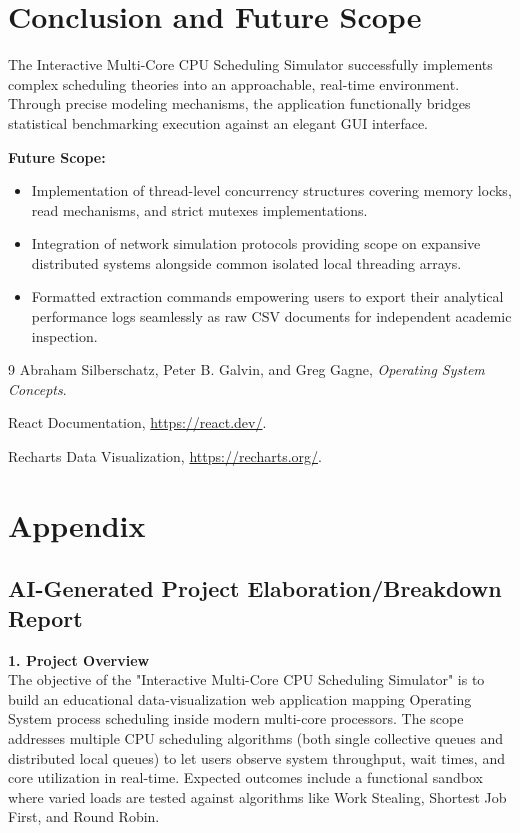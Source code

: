 \documentclass[a4paper]{article}
\begin{document}
\section{Conclusion and Future Scope}
The Interactive Multi-Core CPU Scheduling Simulator successfully implements complex scheduling theories into an approachable, real-time environment. Through precise modeling mechanisms, the application functionally bridges statistical benchmarking execution against an elegant GUI interface.

\textbf{Future Scope:}
\begin{itemize}[noitemsep]
    \item Implementation of thread-level concurrency structures covering memory locks, read mechanisms, and strict mutexes implementations.
    \item Integration of network simulation protocols providing scope on expansive distributed systems alongside common isolated local threading arrays.
    \item Formatted extraction commands empowering users to export their analytical performance logs seamlessly as raw CSV documents for independent academic inspection.
\end{itemize}

\begin{thebibliography}{9}
Abraham Silberschatz, Peter B. Galvin, and Greg Gagne,
\textit{Operating System Concepts}.

React Documentation,
\url{https://react.dev/}.

Recharts Data Visualization,
\url{https://recharts.org/}.
\end{thebibliography}


\appendix
\section{Appendix}

\subsection{AI-Generated Project Elaboration/Breakdown Report}

\textbf{1. Project Overview}\\
The objective of the "Interactive Multi-Core CPU Scheduling Simulator" is to build an educational data-visualization web application mapping Operating System process scheduling inside modern multi-core processors. The scope addresses multiple CPU scheduling algorithms (both single collective queues and distributed local queues) to let users observe system throughput, wait times, and core utilization in real-time. Expected outcomes include a functional sandbox where varied loads are tested against algorithms like Work Stealing, Shortest Job First, and Round Robin.
\end{document}

